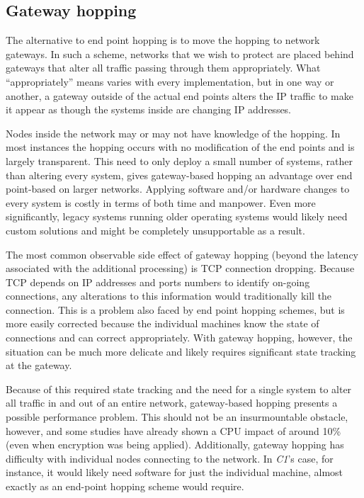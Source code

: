 \subsection{Gateway hopping}
\par The alternative to end point hopping is to move the hopping to network gateways. In such a scheme, networks that we wish to protect are placed behind gateways that alter all traffic passing through them appropriately. What ``appropriately'' means varies with every implementation, but in one way or another, a gateway outside of the actual end points alters the IP traffic to make it appear as though the systems inside are changing IP addresses.

\par Nodes inside the network may or may not have knowledge of the hopping. In most instances the hopping occurs with no modification of the end points and is largely transparent. This need to only deploy a small number of systems, rather than altering every system, gives gateway-based hopping an advantage over end point-based on larger networks. Applying software and/or hardware changes to every system is costly in terms of both time and manpower. Even more significantly, legacy systems running older operating systems would likely need custom solutions and might be completely unsupportable as a result.

\par The most common observable side effect of gateway hopping (beyond the latency associated with the additional processing) is TCP connection dropping. Because TCP depends on IP addresses and ports numbers to identify on-going connections, any alterations to this information would traditionally kill the connection. This is a problem also faced by end point hopping schemes, but is more easily corrected because the individual machines know the state of connections and can correct appropriately. With gateway hopping, however, the situation can be much more delicate and likely requires significant state tracking at the gateway.

\par Because of this required state tracking and the need for a single system to alter all traffic in and out of an entire network, gateway-based hopping presents a possible performance problem. This should not be an insurmountable obstacle, however, and some studies have already shown a CPU impact of around 10\% \cite{TAO} (even when encryption was being applied). Additionally, gateway hopping has difficulty with individual nodes connecting to the network. In \textit{C1}'s case, for instance, it would likely need software for just the individual machine, almost exactly as an end-point hopping scheme would require.

